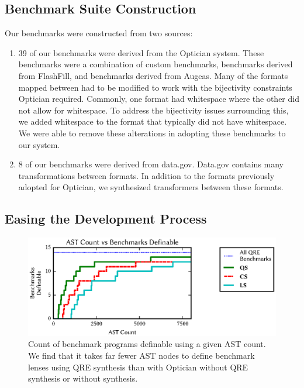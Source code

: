 \documentclass[acmsmall,review,anonymous]{acmart}
\begin{document}
\subsection{Benchmark Suite Construction}
Our benchmarks were constructed from two sources:
\begin{enumerate}
  \item 39 of our benchmarks were derived from the Optician system.  These
  benchmarks were a combination of custom benchmarks, benchmarks derived from
  FlashFill, and benchmarks derived from Augeas.  Many of the formats mapped
  between had to be modified to work with the bijectivity constraints
  Optician required.  Commonly, one format had whitespace where the other did
  not allow for whitespace.  To address the bijectivity issues surrounding this,
  we added whitespace to the format that typically did not have whitespace.  We
  were able to remove these alterations in adopting these benchmarks to our
  system.
  
  \item 8 of our benchmarks were derived from data.gov.  Data.gov contains
  many transformations between formats.  In addition to the formats previously
  adopted for Optician, we synthesized transformers between these formats.
\end{enumerate}

\subsection{Easing the Development Process}

\begin{figure}[t]
\includegraphics{generated-graphs/asts.eps}
\caption{Count of benchmark programs definable using a given AST count. We find
  that it takes far fewer AST nodes to define benchmark lenses using QRE
  synthesis than with Optician without QRE synthesis or without synthesis. }
\label{fig:asts}
\end{figure}
\end{document}
